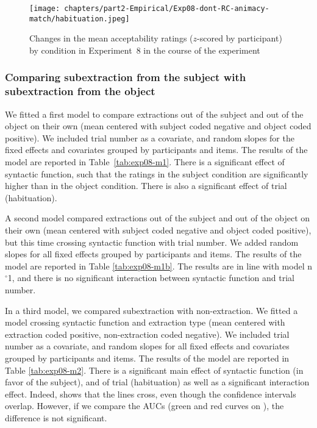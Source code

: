 \begin{figure}
    \centering
    \texttt{[image: chapters/part2-Empirical/Exp08-dont-RC-animacy-match/habituation.jpeg]}
    \caption{Changes in the mean acceptability ratings ($z$-scored by participant) by condition in Experiment~8 in the course of the experiment}
    \label{fig:exp08-habituation}
\end{figure}

\subsubsection{Comparing subextraction from the subject with subextraction from the object}

We fitted a first model to compare extractions out of the subject and out of the object on their own (mean centered with subject coded negative and object coded positive). We included trial number as a covariate, and random slopes for the fixed effects and covariates grouped by participants and items. The results of the model are reported in Table~\ref{tab:exp08-m1}. 
There is a significant effect of syntactic function, such that the ratings in the subject condition are significantly higher than in the object condition. There is also a significant effect of trial (habituation).



A second model compared extractions out of the subject and out of the object on their own (mean centered with subject coded negative and object coded positive), but this time crossing syntactic function with trial number. We added random slopes for all fixed effects grouped by participants and items. The results of the model are reported in Table \ref{tab:exp08-m1b}. 
The results are in line with model n$^{\circ}$1, and there is no significant interaction between syntactic function and trial number.



In a third model, we compared subextraction with non-extraction. We fitted a model crossing syntactic function and extraction type (mean centered with extraction coded positive, non-extraction coded negative). We included trial number as a covariate, and random slopes for all fixed effects and covariates grouped by participants and items. The results of the model are reported in Table \ref{tab:exp08-m2}. 
There is a significant main effect of syntactic function (in favor of the subject), and of trial (habituation) as well as a significant interaction effect. 
Indeed,  shows that the lines cross, even though the confidence intervals overlap. However, if we compare the AUCs (green and red curves on ), the difference is not significant. 

